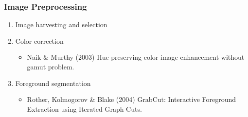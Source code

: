 \documentclass[]{beamer}
\begin{document}
    \begin{frame}
        \frametitle{Image Preprocessing}

        \begin{enumerate}
            \item Image harvesting and selection
            \item Color correction
                \begin{itemize}
                    \item Naik \& Murthy (2003) Hue-preserving color image enhancement without gamut problem.
                \end{itemize}
            \item Foreground segmentation
                \begin{itemize}
                    \item Rother, Kolmogorov \& Blake (2004) GrabCut: Interactive Foreground Extraction using Iterated Graph Cuts.
                \end{itemize}
        \end{enumerate}
    \end{frame}


\end{document}
